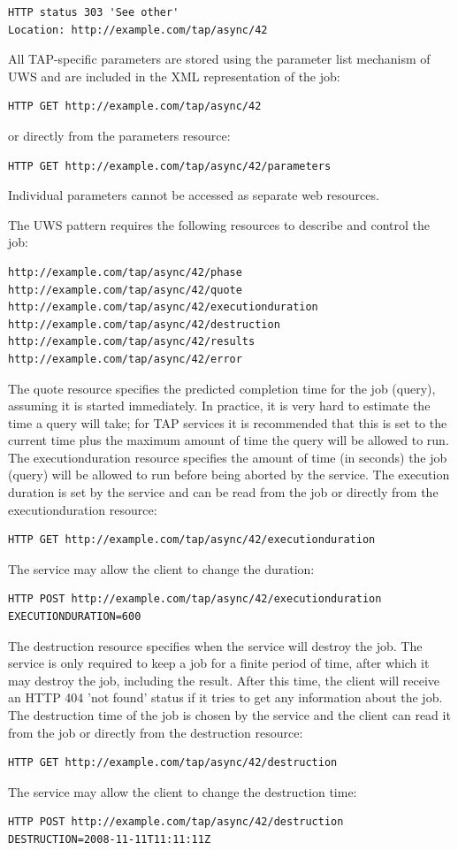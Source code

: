 \documentclass[11pt,letter]{ivoa}
\begin{document}
\begin{verbatim}
HTTP status 303 'See other'
Location: http://example.com/tap/async/42
\end{verbatim}

All TAP-specific parameters are stored using the parameter list mechanism of 
UWS and are included in the XML representation of the job:
\begin{verbatim}
HTTP GET http://example.com/tap/async/42
\end{verbatim}
or directly from the parameters resource:
\begin{verbatim}
HTTP GET http://example.com/tap/async/42/parameters
\end{verbatim}
Individual parameters cannot be accessed as separate web resources.

The UWS pattern requires the following resources to describe and control the 
job:
\begin{verbatim}
http://example.com/tap/async/42/phase
http://example.com/tap/async/42/quote
http://example.com/tap/async/42/executionduration
http://example.com/tap/async/42/destruction
http://example.com/tap/async/42/results
http://example.com/tap/async/42/error
\end{verbatim}
The quote resource specifies the predicted completion time for the job (query), 
assuming it is started immediately. In practice, it is very hard to estimate the 
time a query will take; for TAP services it is recommended that this is set to 
the current time plus the maximum amount of time the query will be allowed to 
run. The executionduration resource specifies the amount of time (in seconds) 
the job (query) will be allowed to run before being aborted by the service. The 
execution duration is set by the service and can be read from the job or 
directly from the executionduration resource:

\begin{verbatim}
HTTP GET http://example.com/tap/async/42/executionduration
\end{verbatim}
The service may allow the client to change the duration:
\begin{verbatim}
HTTP POST http://example.com/tap/async/42/executionduration
EXECUTIONDURATION=600
\end{verbatim}

The destruction resource specifies when the service will destroy the job. The 
service is only required to keep a job for a finite period of time, after which 
it may destroy the job, including the result. After this time, the client will 
receive an HTTP 404 'not found' status if it tries to get any information about 
the job. The destruction time of the job is chosen by the service and the client 
can read it from the job or directly from the destruction resource:
\begin{verbatim}
HTTP GET http://example.com/tap/async/42/destruction
\end{verbatim}
The service may allow the client to change the destruction time:
\begin{verbatim}
HTTP POST http://example.com/tap/async/42/destruction
DESTRUCTION=2008-11-11T11:11:11Z
\end{verbatim}
\end{document}
